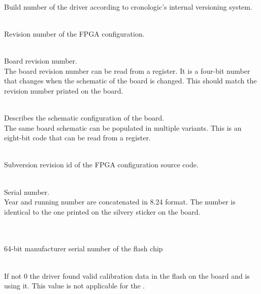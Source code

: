 \\
Build number of the driver according to cronologic's internal versioning system.

\\
Revision number of the FPGA configuration.

\\
Board revision number.\\
The board revision number can be read from a register. It is a four-bit number that changes when the schematic of the board is changed. This should match the revision number printed on the board.

\\
Describes the schematic configuration of the board.\\
The same board schematic can be populated in multiple variants. This is an eight-bit code that can be read from a register.

\\
Subversion revision id of the FPGA configuration source code.

\par

\\
Serial number.\\
Year and running number are concatenated in 8.24 format. The number is identical to the one printed on the silvery sticker on the board.\par

\\
\\
64-bit manufacturer serial number of the flash chip

\\
If not 0 the driver found valid calibration data in the flash on the board and is using it. This value is not applicable for the \deviceName. \par

